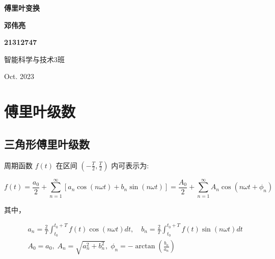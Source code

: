 \documentclass[UTF8]{article}
\theoremstyle{definition}
\begin{document}
\begin{titlepage}
    \begin{center}
        \vspace*{1cm}
        {
        \fontsize{30}{25}
        \selectfont 
        \textbf{傅里叶变换}

        \vspace*{2cm}
        
        \fontsize{30}{25}
        \selectfont 
        
        }

        \vspace{9cm}
        
        {
        \fontsize{20}{20}
        \textbf{邓伟亮}
        \vspace*{1cm}
        
        \textbf{21312747}
  
        }
        
       
        
        \vfill

        {\fontsize{15}{20}\selectfont
        智能科学与技术3班
        
        \vspace*{1cm}
        Oct. 2023
        }
        
        
    \end{center}
\end{titlepage}


\section{傅里叶级数}
\subsection{三角形傅里叶级数}
周期函数 $f(t)$ 在区间 $(-\frac{T}{2},\frac{T}{2})$ 内可表示为:

\begin{equation*}
f(t) = \frac{a_0}{2}+\sum_{n=1}^{\infty}\left[a_n \cos (n \omega t)+b_n \sin (n \omega t)\right] = \frac{A_0}{2}+\sum_{n=1}^{\infty} A_n \cos \left(n \omega t+\phi_n\right)
\end{equation*}

其中，

\begin{equation*}
\begin{aligned}
&a_n  =\frac{2}{T} \int_{t_0}^{t_0+T} f(t) \cos (n \omega t) d t ,\quad
b_n  =\frac{2}{T} \int_{t_0}^{t_0+T} f(t) \sin (n \omega t) d t \\ 
&A_0=a_0 ,\; A_n=\sqrt{a_n^2+b_n^2},  \; \phi_n=-\arctan \left(\frac{b_n}{a_n}\right)\\
\end{aligned}
\end{equation*}
\end{document}

